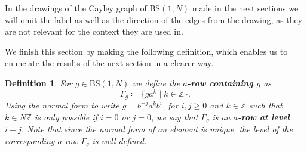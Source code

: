 \documentclass[letterpaper,10pt]{amsart}
\theoremstyle{plain}
\newtheorem{definition}{Definition}[section]
\newcommand{\BS}[1][N]{\mathrm{BS}(1,#1)}
\begin{document}
In the drawings of the Cayley graph of $\BS$ made in the next sections we will omit the label as well as the direction of the edges from the drawing, as they are not relevant for the context they are used in.

We finish this section by making the following definition, which enables us to enunciate the results of the next section in a clearer way.
\begin{definition}For $g\in \BS$ we define the \textbf{$a$-row containing $g$} as 
	$$
	\Gamma_g\coloneqq\{ ga^k\mid k\in \mathbb{Z}\}.
	$$
	Using the normal form to write $g=b^{-j}a^kb^i$, for $i,j\ge 0$ and $k\in \mathbb{Z}$ such that $k\in N\mathbb{Z}$ is only possible if $i=0$ or $j=0$, we say that $\Gamma_g$ is an \textbf{$a$-row at level } $i-j$. Note that since the normal form of an element is unique, the level of the corresponding $a$-row $\Gamma_g$ is well defined.
\end{definition}
\end{document}

